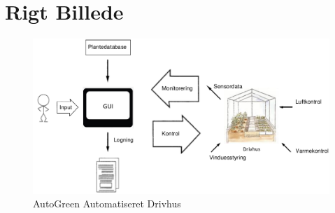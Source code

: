 \section{Rigt Billede}
\begin{figure}[h]
\centering 
\includegraphics[width={\textwidth}, trim=0 250 250 0, clip=true] {../fig/Rigt_Billede.pdf}
\caption{AutoGreen Automatiseret Drivhus}
\label{fig:Rigt_Billede}
\end{figure}
